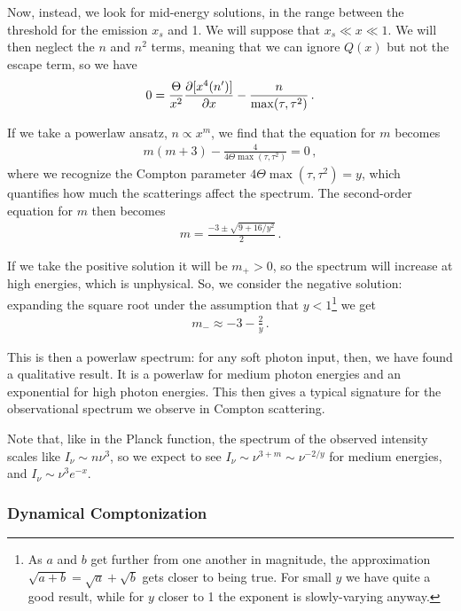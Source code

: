 \documentclass[main.tex]{subfiles}
\begin{document}

Now, instead, we look for mid-energy solutions, in the range between the threshold for the emission \(x_s\) and 1. We will suppose that \(x_s \ll x \ll 1\). 
We will then neglect the \(n\) and \(n^2\) terms, meaning that we can ignore \(Q(x)\) but not the escape term, so we have 
%
\begin{align}
0 = \frac{\Theta}{x^2} \pdv{[x^{4} (n')]}{x} - \frac{n}{\max (\tau , \tau^2)}
\,.
\end{align}

If we take a powerlaw ansatz, \(n \propto x^{m}\), we find that the equation for \(m\) becomes 
%
\begin{align}
m(m+3) - \frac{4}{4 \Theta \max (\tau, \tau^2)}= 0 
\,,
\end{align}
%
where we recognize the Compton parameter \(4 \Theta \max (\tau , \tau^2) = y\), which quantifies how much the scatterings affect the spectrum. 
The second-order equation for \(m\) then becomes 
%
\begin{align}
m = \frac{-3 \pm \sqrt{9 + 16 / y^2}}{2}
\,.
\end{align}

If we take the positive solution it will be \(m_+>0\), so the spectrum will increase at high energies, which is unphysical. 
So, we consider the negative solution: expanding the square root under the assumption that \(y < 1\)\footnote{As \(a\) and \(b\) get further from one another in magnitude, the approximation \(\sqrt{a + b} = \sqrt{a} + \sqrt{b}\) gets closer to being true. For small \(y\) we have quite a good result, while for \(y\) closer to 1 the exponent is slowly-varying anyway.} we get 
%
\begin{align}
m_- \approx -3 - \frac{2}{y}
\,.
\end{align}

This is then a powerlaw spectrum: for any soft photon input, then, we have found a qualitative result. It is a powerlaw for medium photon energies and an exponential for high photon energies. 
This then gives a typical signature for the observational spectrum we observe in Compton scattering. 

Note that, like in the Planck function, the spectrum of the observed intensity scales like \(I_\nu \sim n \nu^3\), so we expect to see \(I_\nu \sim \nu^{3+m} \sim \nu^{-2/y}\) for medium energies, and \(I_\nu \sim \nu^3 e^{-x}\). 

\subsubsection{Dynamical Comptonization}
\end{document}

